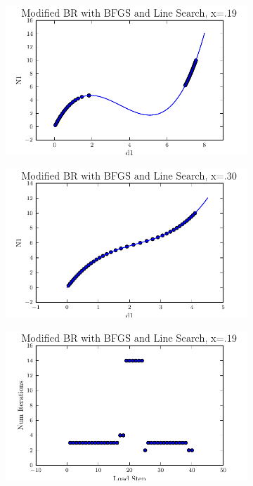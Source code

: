 \documentclass[10pt,letterpaper]{article}
\begin{document}
\begin{figure}[!tbh]
  \begin{subfigure}[b]{.6\textwidth}
    \includegraphics[width=\textwidth]{moded_nr_bfgs_wls_x19.pdf}
    \caption{}
    \label{fig6:label:a}
  \end{subfigure}
  \hfill
  \begin{subfigure}[b]{.6\textwidth}
    \includegraphics[width=\textwidth]{moded_nr_bfgs_wls_x30.pdf}
    \caption{}
    \label{fig6:label:b}
  \end{subfigure}
  \hfill
    \begin{subfigure}[b]{.6\textwidth}
    \includegraphics[width=\textwidth]{moded_nr_bfgs_wls_x19_conv.pdf}

\end{subfigure}
\end{figure}
\end{document}
